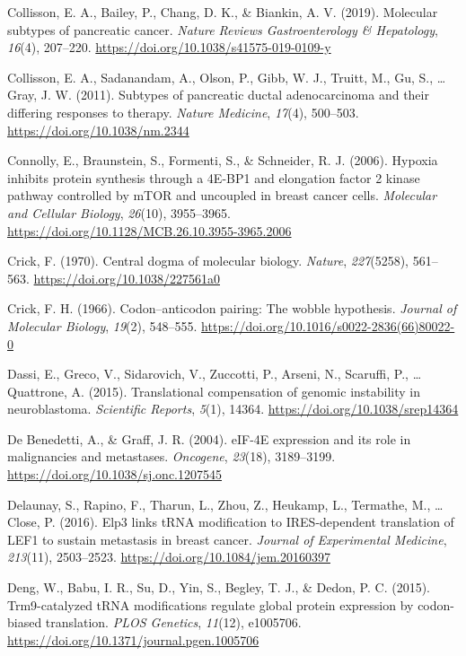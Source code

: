\documentclass[12pt,openany]{book}
\begin{document}
\hypertarget{ref-Collisson2019}{}
Collisson, E. A., Bailey, P., Chang, D. K., \& Biankin, A. V. (2019).
Molecular subtypes of pancreatic cancer. \emph{Nature Reviews
Gastroenterology \& Hepatology}, \emph{16}(4), 207--220.
\url{https://doi.org/10.1038/s41575-019-0109-y}

\hypertarget{ref-Collisson2011}{}
Collisson, E. A., Sadanandam, A., Olson, P., Gibb, W. J., Truitt, M.,
Gu, S., \ldots{} Gray, J. W. (2011). Subtypes of pancreatic ductal
adenocarcinoma and their differing responses to therapy. \emph{Nature
Medicine}, \emph{17}(4), 500--503. \url{https://doi.org/10.1038/nm.2344}

\hypertarget{ref-Connolly2006}{}
Connolly, E., Braunstein, S., Formenti, S., \& Schneider, R. J. (2006).
Hypoxia inhibits protein synthesis through a 4E-BP1 and elongation
factor 2 kinase pathway controlled by mTOR and uncoupled in breast
cancer cells. \emph{Molecular and Cellular Biology}, \emph{26}(10),
3955--3965. \url{https://doi.org/10.1128/MCB.26.10.3955-3965.2006}

\hypertarget{ref-Crick1970}{}
Crick, F. (1970). Central dogma of molecular biology. \emph{Nature},
\emph{227}(5258), 561--563. \url{https://doi.org/10.1038/227561a0}

\hypertarget{ref-Crick1966}{}
Crick, F. H. (1966). Codon--anticodon pairing: The wobble hypothesis.
\emph{Journal of Molecular Biology}, \emph{19}(2), 548--555.
\url{https://doi.org/10.1016/s0022-2836(66)80022-0}

\hypertarget{ref-Dassi2015}{}
Dassi, E., Greco, V., Sidarovich, V., Zuccotti, P., Arseni, N.,
Scaruffi, P., \ldots{} Quattrone, A. (2015). Translational compensation
of genomic instability in neuroblastoma. \emph{Scientific Reports},
\emph{5}(1), 14364. \url{https://doi.org/10.1038/srep14364}

\hypertarget{ref-DeBenedetti2004}{}
De Benedetti, A., \& Graff, J. R. (2004). eIF-4E expression and its role
in malignancies and metastases. \emph{Oncogene}, \emph{23}(18),
3189--3199. \url{https://doi.org/10.1038/sj.onc.1207545}

\hypertarget{ref-Delaunay2016}{}
Delaunay, S., Rapino, F., Tharun, L., Zhou, Z., Heukamp, L., Termathe,
M., \ldots{} Close, P. (2016). Elp3 links tRNA modification to
IRES-dependent translation of LEF1 to sustain metastasis in breast
cancer. \emph{Journal of Experimental Medicine}, \emph{213}(11),
2503--2523. \url{https://doi.org/10.1084/jem.20160397}

\hypertarget{ref-Deng2015}{}
Deng, W., Babu, I. R., Su, D., Yin, S., Begley, T. J., \& Dedon, P. C.
(2015). Trm9-catalyzed tRNA modifications regulate global protein
expression by codon-biased translation. \emph{PLOS Genetics},
\emph{11}(12), e1005706.
\url{https://doi.org/10.1371/journal.pgen.1005706}
\end{document}
